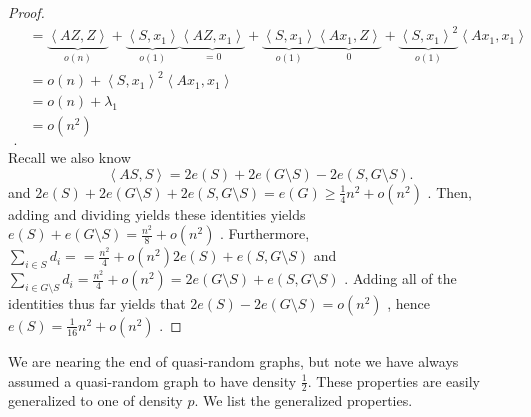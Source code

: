 \begin{proof}
\begin{align*}
			    &= \underbrace{\left<AZ, Z \right>}_{o\left( n \right) }  + \underbrace{\left<S, x_1 \right> }_{o\left( 1 \right) } \underbrace{\left<AZ, x_1 \right>}_{=0}  + \underbrace{\left<S, x_1 \right>}_{o\left( 1 \right) }  \underbrace{\left<Ax_1, Z \right>}_{0} + \underbrace{\left<S, x_1 \right> ^2}_{o\left( 1 \right) } \left<Ax_1, x_1 \right>   \\
			    &= o\left( n \right)  + \left<S, x_1 \right> ^2 \left<Ax_1,x_1 \right>  \\
			    &= o\left( n \right)  + \lambda_1 \\
			    &= o\left( n^2 \right)  \\
.\end{align*}
Recall we also know \[
	\left<AS, S \right> = 2e\left( S \right)  + 2e\left( G \setminus S \right) - 2e\left( S, G \setminus S  \right)
.\]
and \(2e\left( S \right)  + 2e\left( G \setminus S \right)  + 2e\left( S, G \setminus S \right) = e\left( G \right) \ge \frac{1}{4} n^2 + o\left( n^2 \right)  \) . Then, adding and dividing yields these identities yields  \(e\left( S \right)  + e\left( G \setminus S \right) = \frac{n^2}{8} + o\left( n^2 \right) \) . Furthermore, \(\sum_{i \in S}^{} d_{i} = = \frac{n^2}{4} + o\left( n^2 \right)  2e\left( S \right)  + e\left( S, G \setminus S \right) \) and \(\sum_{i \in G \setminus S}^{} d_{i} = \frac{n^2}{4} + o\left( n^2 \right)  = 2e\left( G \setminus S \right) + e\left( S, G \setminus S \right) \) . Adding all of the identities thus far yields that \(2e\left( S \right)  -2e\left( G \setminus S \right)  = o\left( n^2 \right) \) , hence \(e\left( S \right)  = \frac{1}{16}n^2 + o\left( n^2 \right) \) .
\end{proof}
We are nearing the end of quasi-random graphs, but note we have always assumed a quasi-random graph to have density \(\frac{1}{2}\). These properties are easily generalized to one of density \(p\). We list the generalized properties.
